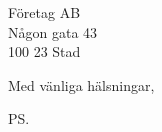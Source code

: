 \documentclass[version=last,../skclettr,urdh]{scrlttr2}
\begin{document}
	\begin{letter}{Företag AB\\ Någon gata 43\\ 100 23 Stad}
		\opening{}
		\Blindtext[2][1]

		\closing{Med vänliga hälsningar,}
		\ps

	\end{letter}
\end{document}
